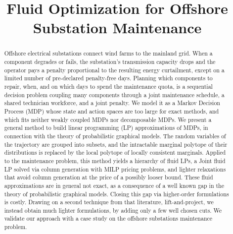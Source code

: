 \documentclass{article}
\title{Fluid Optimization for Offshore Substation Maintenance}
\author{}
\date{}
\begin{document}
\maketitle

\begin{abstract}
Offshore electrical substations connect wind farms to the mainland grid. When a component
degrades or fails, the substation's transmission capacity drops and the operator pays a penalty
proportional to the resulting energy curtailment, except on a limited number of pre-declared penalty-free days. Planning which components to repair, when, and on which days to
spend the maintenance quota, is a sequential decision problem coupling many components through a
joint maintenance schedule, a shared technician workforce, and a joint penalty. We model it as a Markov Decision
Process (MDP) whose state and action spaces are too large for exact methods, and which fits neither weakly coupled
MDPs nor decomposable MDPs. We present a general method to build linear programming (LP) approximations of MDPs, in
connection with the theory of probabilistic graphical models. The random variables of the trajectory are grouped into
subsets, and the intractable marginal polytope of their distributions is replaced by the local polytope of locally
consistent marginals. Applied to the maintenance problem, this method yields a hierarchy of fluid LPs, a Joint fluid LP solved via column generation with MILP pricing problems, and lighter relaxations that avoid column generation at the
price of a possibly looser bound. These fluid approximations are in general not exact, as a consequence of a well
known gap in the theory of probabilistic graphical models. Closing this gap via higher-order
formulations is costly. Drawing on a second technique from that literature, lift-and-project, we instead obtain
much lighter formulations, by adding only a few well chosen cuts. We validate our approach with a case study on the
offshore substations maintenance problem.
\end{abstract}
\end{document}
